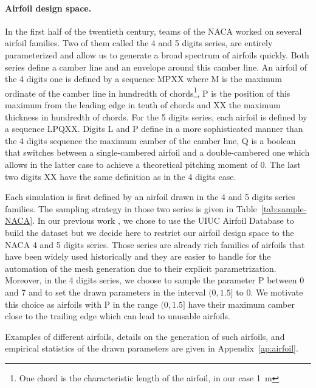 \paragraph{Airfoil design space.} In the first half of the twentieth century, teams of the \acrfull{NACA} worked on several airfoil families. Two of them called the 4 and 5 digits series, are entirely parameterized and allow us to generate a broad spectrum of airfoils quickly. Both series define a camber line and an envelope around this camber line. An airfoil of the 4 digits one is defined by a sequence MPXX where M is the maximum ordinate of the camber line in hundredth of chords\footnote{One chord is the characteristic length of the airfoil, in our case \SI{1}{\meter}}, P is the position of this maximum from the leading edge in tenth of chords and XX the maximum thickness in hundredth of chords. For the 5 digits series, each airfoil is defined by a sequence LPQXX. Digits L and P define in a more sophisticated manner than the 4 digits sequence the maximum camber of the camber line, Q is a boolean that switches between a single-cambered airfoil and a double-cambered one which allows in the latter case to achieve a theoretical pitching moment of 0. The last two digits XX have the same definition as in the 4 digits case. 

Each simulation is first defined by an airfoil drawn in the 4 and 5 digits series families. The sampling strategy in those two series is given in Table~\ref{tab:sample-NACA}. In our previous work \cite{bonnet2022an}, we chose to use the UIUC Airfoil Database \cite{UIUC} to build the dataset but we decide here to restrict our airfoil design space to the \acrshort{NACA} 4 and 5 digits series. Those series are already rich families of airfoils that have been widely used historically and they are easier to handle for the automation of the mesh generation due to their explicit parametrization. Moreover, in the 4 digits series, we choose to sample the parameter P between 0 and 7 and to set the drawn parameters in the interval $(0, 1.5]$ to 0. We motivate this choice as airfoils with P in the range $(0, 1.5]$ have their maximum camber close to the trailing edge which can lead to unusable airfoils.

Examples of different airfoils, details on the generation of such airfoils, and empirical statistics of the drawn parameters are given in Appendix~\ref{ap:airfoil}.

